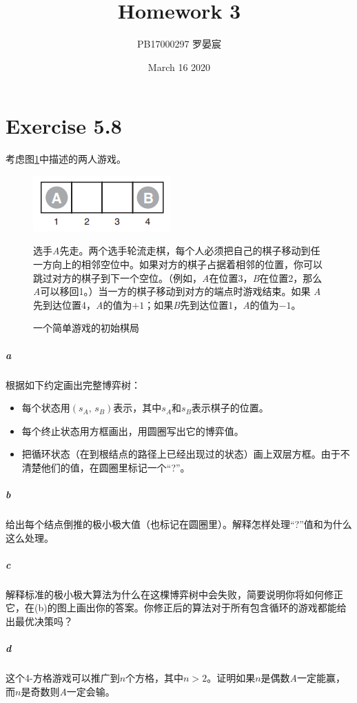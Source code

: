 \documentclass{article}
\title{Homework 3}
\author{PB17000297 罗晏宸}
\date{March 16 2020}
\begin{document}
\maketitle

\section{Exercise 5.8}
考虑图\ref{figure5.17}中描述的两人游戏。
\begin{figure}[h]
    {
        \centering
        \includegraphics[]{Figure5-17.png}
        \caption{一个简单游戏的初始棋局}
        \label{figure5.17}
    }
    选手\textit{A}先走。两个选手轮流走棋，每个人必须把自己的棋子移动到任一方向上的相邻空位中。如果对方的棋子占据着相邻的位置，你可以跳过对方的棋子到下一个空位。（例如，\textit{A}在位置3，\textit{B}在位置2，那么\textit{A}可以移回1。）当一方的棋子移动到对方的端点时游戏结束。如果 \textit{A} 先到达位置4，\textit{A}的值为$+1$；如果\textit{B}先到达位置1，\textit{A}的值为$-1$。
\end{figure}
\subparagraph{a}
根据如下约定画出完整博弈树：
\begin{itemize}
    \item 每个状态用$(s_A,\, s_B)$表示，其中$s_A$和$s_B$表示棋子的位置。
    \item 每个终止状态用方框画出，用圆圈写出它的博弈值。
    \item 把循环状态（在到根结点的路径上已经出现过的状态）画上双层方框。由于不清楚他们的值，在圆圈里标记一个“?”。
\end{itemize}
\subparagraph{b}
给出每个结点倒推的极小极大值（也标记在圆圈里）。解释怎样处理“?”值和为什么这么处理。
\subparagraph{c}
解释标准的极小极大算法为什么在这棵博弈树中会失败，简要说明你将如何修正它，在(b)的图上画出你的答案。你修正后的算法对于所有包含循环的游戏都能给出最优决策吗？
\subparagraph{d}
这个4-方格游戏可以推广到$n$个方格，其中$n > 2$。证明如果$n$是偶数\textit{A}一定能赢，而$n$是奇数则\textit{A}一定会输。
\end{document}
